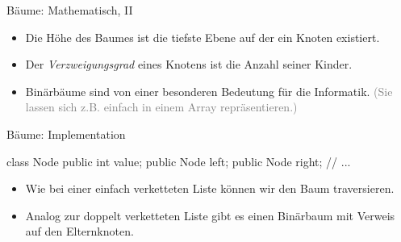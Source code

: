 \begin{frame}{Bäume: Mathematisch, II}
    \begin{itemize}[<+(1)->]
        \widei
        \item Die Höhe des Baumes ist die tiefste Ebene auf der ein Knoten existiert.
        \item Der \textit{Verzweigungsgrad} eines Knotens ist die Anzahl seiner Kinder.
        \item Binärbäume sind von einer besonderen Bedeutung für die Informatik.\pause{} \textcolor{gray}{(Sie lassen sich z.B. einfach in einem Array repräsentieren.)}
    \end{itemize}
\end{frame}

\begin{frame}[fragile]{Bäume: Implementation}
    \pause{}
    \begin{minipage}{0.4\linewidth}
\small%
\begin{plainjava}
class Node {
    public int value;
    public Node left;
    public Node right;
    // ...
}
\end{plainjava}
    \end{minipage}\hfill{}\pause{}\begin{minipage}{0.55\linewidth}%
\centering{}
\end{minipage}\vfill
    \begin{itemize}[<+(1)->]
        \widei
        \item Wie bei einer einfach verketteten Liste können wir den Baum traversieren.
        \item Analog zur doppelt verketteten Liste gibt es einen Binärbaum mit Verweis auf den Elternknoten.
    \end{itemize}
\end{frame}

